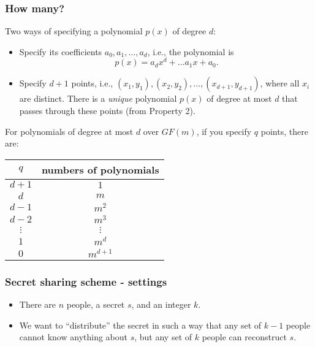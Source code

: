 \begin{frame}
  \frametitle{How many?}
\end{frame}

\begin{frame}
  Two ways of specifying a polynomial $p(x)$ of degree $d$:
  \begin{itemize}
  \item Specify its coefficients $a_0,a_1,\ldots,a_d$, i.e., the
    polynomial is
    \[
    p(x) = a_d x^d + \ldots a_1 x + a_0.
    \]
    \pause
  \item Specify $d+1$ points, i.e.,
    $(x_1,y_1),(x_2,y_2),\ldots,(x_{d+1},y_{d+1})$, where all $x_i$
    are distinct.  There is a {\em unique} polynomial $p(x)$ of degree
    at most $d$ that passes through these points (from Property 2).
  \end{itemize}
\end{frame}

\begin{frame}
  For polynomials of degree at most $d$ over $GF(m)$, if you specify
  $q$ points, there are:
  
  \begin{tabular}{c|c}
    $q$ & numbers of polynomials \\
    \hline
    $d+1$ & $1$ \\
    $d$ & $m$ \\
    $d-1$ & $m^2$ \\
    $d-2$ & $m^3$ \\
    $\vdots$ & $\vdots$ \\
    $1$ & $m^d$ \\
    $0$ & $m^{d+1}$
  \end{tabular}
\end{frame}

\begin{frame}
  \frametitle{Secret sharing scheme - settings}
  \pause
  \begin{itemize}
  \item There are $n$ people, a secret $s$, and an integer $k$.
  \item We want to ``distribute'' the secret in such a way that any
    set of $k-1$ people cannot know anything about $s$, but any set of
    $k$ people can reconstruct $s$.
  \end{itemize}
\end{frame}

